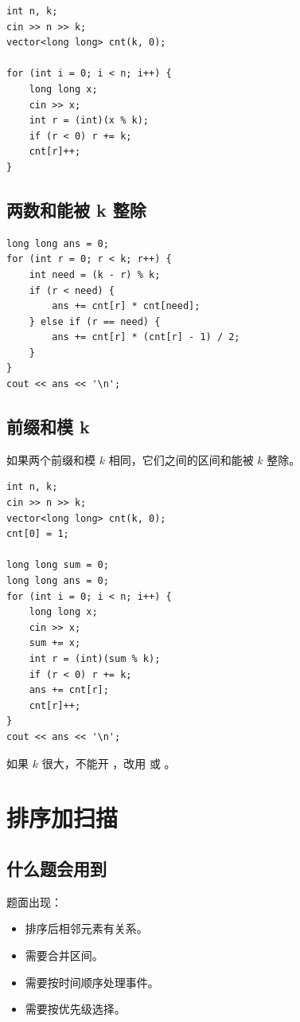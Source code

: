 \begin{lstlisting}
int n, k;
cin >> n >> k;
vector<long long> cnt(k, 0);

for (int i = 0; i < n; i++) {
    long long x;
    cin >> x;
    int r = (int)(x % k);
    if (r < 0) r += k;
    cnt[r]++;
}
\end{lstlisting}

\subsection{两数和能被 k 整除}

\begin{lstlisting}
long long ans = 0;
for (int r = 0; r < k; r++) {
    int need = (k - r) % k;
    if (r < need) {
        ans += cnt[r] * cnt[need];
    } else if (r == need) {
        ans += cnt[r] * (cnt[r] - 1) / 2;
    }
}
cout << ans << '\n';
\end{lstlisting}

\subsection{前缀和模 k}

如果两个前缀和模 $k$ 相同，它们之间的区间和能被 $k$ 整除。

\begin{lstlisting}
int n, k;
cin >> n >> k;
vector<long long> cnt(k, 0);
cnt[0] = 1;

long long sum = 0;
long long ans = 0;
for (int i = 0; i < n; i++) {
    long long x;
    cin >> x;
    sum += x;
    int r = (int)(sum % k);
    if (r < 0) r += k;
    ans += cnt[r];
    cnt[r]++;
}
cout << ans << '\n';
\end{lstlisting}

如果 $k$ 很大，不能开 ，改用  或 。

\section{排序加扫描}\label{sec:06-12}

\subsection{什么题会用到}

题面出现：

\begin{itemize}
  \item 排序后相邻元素有关系。
  \item 需要合并区间。
  \item 需要按时间顺序处理事件。
  \item 需要按优先级选择。
\end{itemize}

